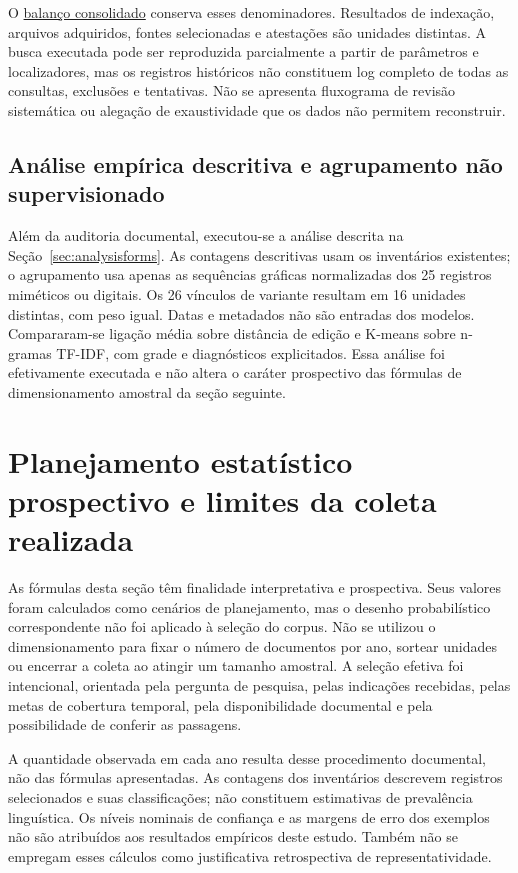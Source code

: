 O \href{https://github.com/murilloed/historia-riso-escrito-portugues/blob/main/data/consolidated_inventory.json}{balanço consolidado} conserva esses denominadores. Resultados de indexação, arquivos adquiridos, fontes selecionadas e atestações são unidades distintas. A busca executada pode ser reproduzida parcialmente a partir de parâmetros e localizadores, mas os registros históricos não constituem log completo de todas as consultas, exclusões e tentativas. Não se apresenta fluxograma de revisão sistemática ou alegação de exaustividade que os dados não permitem reconstruir.

\subsection{Análise empírica descritiva e agrupamento não supervisionado}
Além da auditoria documental, executou-se a análise descrita na Seção~\ref{sec:analysisforms}. As contagens descritivas usam os inventários existentes; o agrupamento usa apenas as sequências gráficas normalizadas dos 25 registros miméticos ou digitais. Os 26 vínculos de variante resultam em 16 unidades distintas, com peso igual. Datas e metadados não são entradas dos modelos. Compararam-se ligação média sobre distância de edição e K-means sobre n-gramas TF-IDF, com grade e diagnósticos explicitados. Essa análise foi efetivamente executada e não altera o caráter prospectivo das fórmulas de dimensionamento amostral da seção seguinte.

\section{Planejamento estatístico prospectivo e limites da coleta realizada}
\label{sec:planejamento-prospectivo}

As fórmulas desta seção têm finalidade interpretativa e prospectiva. Seus valores foram calculados como cenários de planejamento, mas o desenho probabilístico correspondente não foi aplicado à seleção do corpus. Não se utilizou o dimensionamento para fixar o número de documentos por ano, sortear unidades ou encerrar a coleta ao atingir um tamanho amostral. A seleção efetiva foi intencional, orientada pela pergunta de pesquisa, pelas indicações recebidas, pelas metas de cobertura temporal, pela disponibilidade documental e pela possibilidade de conferir as passagens.

A quantidade observada em cada ano resulta desse procedimento documental, não das fórmulas apresentadas. As contagens dos inventários descrevem registros selecionados e suas classificações; não constituem estimativas de prevalência linguística. Os níveis nominais de confiança e as margens de erro dos exemplos não são atribuídos aos resultados empíricos deste estudo. Também não se empregam esses cálculos como justificativa retrospectiva de representatividade.

